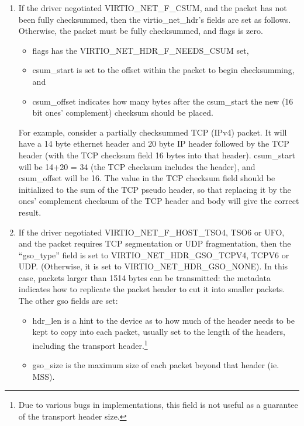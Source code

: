 \begin{enumerate}
\item If the driver negotiated VIRTIO_NET_F_CSUM, and the packet has
  not been fully checksummed, then the virtio_net_hdr's fields
  are set as follows. Otherwise, the packet must be fully
  checksummed, and flags is zero.
  \begin{itemize}
  \item flags has the VIRTIO_NET_HDR_F_NEEDS_CSUM set,

  \item csum_start is set to the offset within the packet to begin checksumming,
    and

  \item csum_offset indicates how many bytes after the csum_start the
    new (16 bit ones' complement) checksum should be placed.
  \end{itemize}

For example, consider a partially checksummed TCP (IPv4) packet.
It will have a 14 byte ethernet header and 20 byte IP header
followed by the TCP header (with the TCP checksum field 16 bytes
into that header). csum_start will be 14+20 = 34 (the TCP
checksum includes the header), and csum_offset will be 16. The
value in the TCP checksum field should be initialized to the sum
of the TCP pseudo header, so that replacing it by the ones'
complement checksum of the TCP header and body will give the
correct result.

\item If the driver negotiated
  VIRTIO_NET_F_HOST_TSO4, TSO6 or UFO, and the packet requires
  TCP segmentation or UDP fragmentation, then the “gso_type”
  field is set to VIRTIO_NET_HDR_GSO_TCPV4, TCPV6 or UDP.
  (Otherwise, it is set to VIRTIO_NET_HDR_GSO_NONE). In this
  case, packets larger than 1514 bytes can be transmitted: the
  metadata indicates how to replicate the packet header to cut it
  into smaller packets. The other gso fields are set:

  \begin{itemize}
  \item hdr_len is a hint to the device as to how much of the header
    needs to be kept to copy into each packet, usually set to the
    length of the headers, including the transport header.\footnote{Due to various bugs in implementations, this field is not useful
as a guarantee of the transport header size.
}

  \item gso_size is the maximum size of each packet beyond that
    header (ie. MSS).


\end{itemize}
\end{enumerate}
